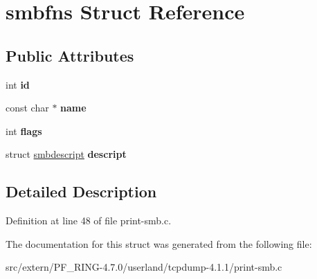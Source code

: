 \hypertarget{structsmbfns}{
\section{smbfns Struct Reference}
\label{structsmbfns}
}
\subsection*{Public Attributes}
\begin{DoxyCompactItemize}
\item 
\hypertarget{structsmbfns_a293d3597bc6c0c5ed295bb34de03f289}{
int {\bfseries id}}
\label{structsmbfns_a293d3597bc6c0c5ed295bb34de03f289}

\item 
\hypertarget{structsmbfns_a878ab588d196542d2cb8c4c8f505f616}{
const char $\ast$ {\bfseries name}}
\label{structsmbfns_a878ab588d196542d2cb8c4c8f505f616}

\item 
\hypertarget{structsmbfns_a5b177fed0ebc27250d719886ccf9b1c9}{
int {\bfseries flags}}
\label{structsmbfns_a5b177fed0ebc27250d719886ccf9b1c9}

\item 
\hypertarget{structsmbfns_a01da7ca94cb7fda3bb664d5561757f2f}{
struct \hyperlink{structsmbdescript}{smbdescript} {\bfseries descript}}
\label{structsmbfns_a01da7ca94cb7fda3bb664d5561757f2f}

\end{DoxyCompactItemize}


\subsection{Detailed Description}


Definition at line 48 of file print-\/smb.c.



The documentation for this struct was generated from the following file:\begin{DoxyCompactItemize}
\item 
src/extern/PF\_\-RING-\/4.7.0/userland/tcpdump-\/4.1.1/print-\/smb.c\end{DoxyCompactItemize}
